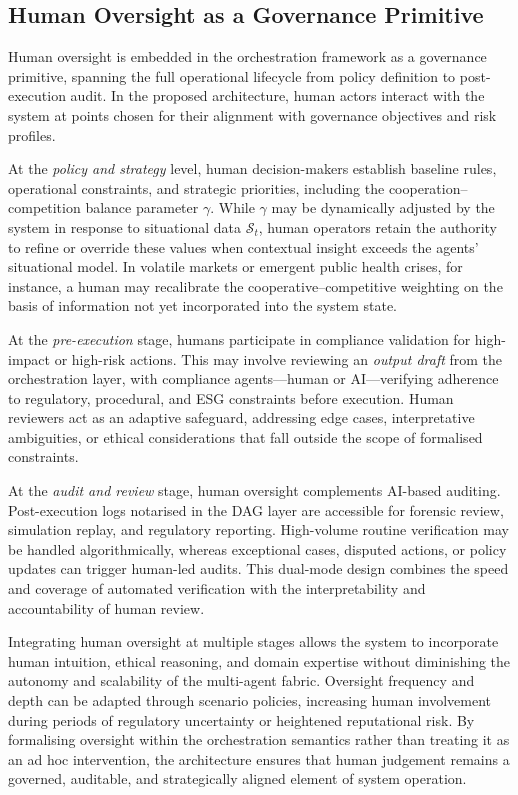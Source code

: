 \documentclass[oneside,10pt]{swissi}
\begin{document}
\subsection{Human Oversight as a Governance Primitive}\label{subsec:human-oversight}

Human oversight is embedded in the orchestration framework as a governance primitive, spanning the full operational lifecycle from policy definition to post-execution audit. In the proposed architecture, human actors interact with the system at points chosen for their alignment with governance objectives and risk profiles.

At the \emph{policy and strategy} level, human decision-makers establish baseline rules, operational constraints, and strategic priorities, including the cooperation--competition balance parameter $\gamma$. While $\gamma$ may be dynamically adjusted by the system in response to situational data $\mathcal{S}_t$, human operators retain the authority to refine or override these values when contextual insight exceeds the agents’ situational model. In volatile markets or emergent public health crises, for instance, a human may recalibrate the cooperative–competitive weighting on the basis of information not yet incorporated into the system state.

At the \emph{pre-execution} stage, humans participate in compliance validation for high-impact or high-risk actions. This may involve reviewing an \emph{output draft} from the orchestration layer, with compliance agents—human or AI—verifying adherence to regulatory, procedural, and ESG constraints before execution. Human reviewers act as an adaptive safeguard, addressing edge cases, interpretative ambiguities, or ethical considerations that fall outside the scope of formalised constraints.

At the \emph{audit and review} stage, human oversight complements AI-based auditing. Post-execution logs notarised in the DAG layer are accessible for forensic review, simulation replay, and regulatory reporting. High-volume routine verification may be handled algorithmically, whereas exceptional cases, disputed actions, or policy updates can trigger human-led audits. This dual-mode design combines the speed and coverage of automated verification with the interpretability and accountability of human review.

Integrating human oversight at multiple stages allows the system to incorporate human intuition, ethical reasoning, and domain expertise without diminishing the autonomy and scalability of the multi-agent fabric. Oversight frequency and depth can be adapted through scenario policies, increasing human involvement during periods of regulatory uncertainty or heightened reputational risk. By formalising oversight within the orchestration semantics rather than treating it as an ad hoc intervention, the architecture ensures that human judgement remains a governed, auditable, and strategically aligned element of system operation.
\end{document}
